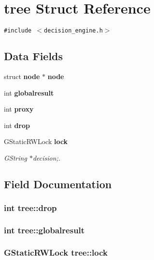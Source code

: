 \section{tree Struct Reference}
\label{structtree}
{\tt \#include $<$decision\_\-engine.h$>$}

\subsection*{Data Fields}
\begin{CompactItemize}
\item 
struct {\bf node} $\ast$ {\bf node}
\item 
int {\bf globalresult}
\item 
int {\bf proxy}
\item 
int {\bf drop}
\item 
GStaticRWLock {\bf lock}
\begin{CompactList}\small\item\em GString $\ast$decision;. \item\end{CompactList}\end{CompactItemize}


\subsection{Field Documentation}
\subsubsection[{drop}]{\setlength{\rightskip}{0pt plus 5cm}int {\bf tree::drop}}\label{structtree_5de46b7b45671f865af602876af472ec}


\subsubsection[{globalresult}]{\setlength{\rightskip}{0pt plus 5cm}int {\bf tree::globalresult}}\label{structtree_490ca774657050cfef20778e3ab7bd78}


\subsubsection[{lock}]{\setlength{\rightskip}{0pt plus 5cm}GStaticRWLock {\bf tree::lock}}\label{structtree_ffee6355700bddac1dd916bfb9ec991b}



